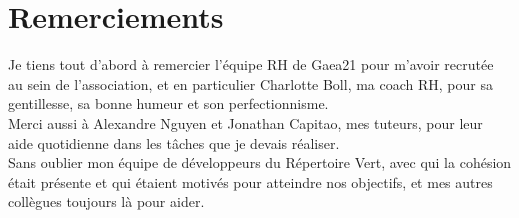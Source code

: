 \section*{Remerciements}
\thispagestyle{noTitledHeader}

\begin{flushleft}

Je tiens tout d'abord à remercier l'équipe RH de Gaea21 pour m'avoir recrutée au sein de l'association, et en particulier Charlotte Boll, ma coach RH, pour sa gentillesse, sa bonne humeur et son perfectionnisme.\\
\bigbreak
Merci aussi à Alexandre Nguyen et Jonathan Capitao, mes tuteurs, pour leur aide quotidienne dans les tâches que je devais réaliser.\\
\bigbreak
Sans oublier mon équipe de développeurs du Répertoire Vert, avec qui la cohésion était présente et qui étaient motivés pour atteindre nos objectifs, et mes autres collègues toujours là pour aider.

\end{flushleft}